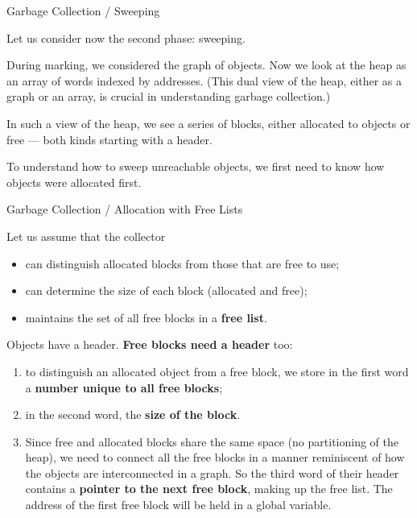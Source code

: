 \documentclass[compress,dvipdfmx]{beamer}
\begin{document}
%
\begin{frame}{Garbage Collection / Sweeping}

  Let us consider now the second phase: sweeping.

  \bigskip

  During marking, we considered the graph of objects. Now we look at
  the heap as an array of words indexed by addresses. (This dual view
  of the heap, either as a graph or an array, is crucial in
  understanding garbage collection.)

  \bigskip

  In such a view of the heap, we see a series of blocks, either
  allocated to objects or free --- both kinds starting with a header.

  \bigskip

  To understand how to sweep unreachable objects, we first need to
  know how objects were allocated first.

\end{frame}

%
\begin{frame}{Garbage Collection / Allocation with Free Lists}

  Let us assume that the collector
  \begin{itemize}

    \item can distinguish allocated blocks from those that are free to
      use;

    \item can determine the size of each block (allocated and free);

    \item maintains the set of all free blocks in a \textbf{free
      list}.

  \end{itemize}
  Objects have a header. \textbf{Free blocks need a header} too:
  \begin{enumerate}

    \item to distinguish an allocated object from a free block, we
      store in the first word a \textbf{number unique to all free
        blocks};

    \item in the second word, the \textbf{size of the block}.

    \item Since free and allocated blocks share the same space (no
      partitioning of the heap), we need to connect all the free
      blocks in a manner reminiscent of how the objects are
      interconnected in a graph. So the third word of their header
      contains a \textbf{pointer to the next free block}, making up
      the free list. The address of the first free block will be held
      in a global variable.

  \end{enumerate}

\end{frame}
\end{document}
